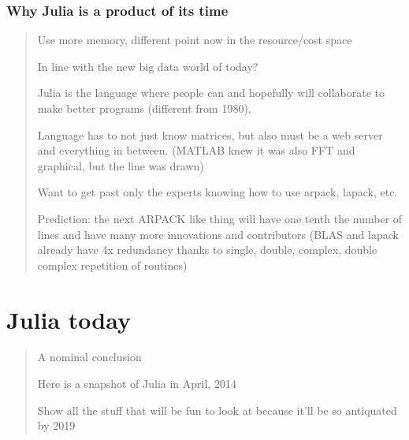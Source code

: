 \documentclass[12pt]{mitthesis}
\begin{document}
\section{Why Julia is a product of its time}
\begin{quotation}
Use more memory, different point now in the resource/cost space

In line with the new big data world of today?

Julia is the language where people can and hopefully will collaborate
to make better programs (different from 1980).

Language has to not just know matrices, but also must be a web server
and everything in between. (MATLAB knew it was also FFT and graphical,
but the line was drawn)

Want to get past only the experts knowing how to use arpack, lapack,
etc.

Prediction: the next ARPACK like thing will have one tenth the number
of lines and have many more innovations and contributors (BLAS and
lapack already have 4x redundancy thanks to single, double, complex,
double complex repetition of routines)
\end{quotation}

\part{Julia today}
\begin{quotation}
A nominal conclusion

Here is a snapshot of Julia in April, 2014

Show all the stuff that will be fun to look at because it\textquoteright{}ll
be so antiquated by 2019\end{quotation}

%
%
%
%
%
%
%
\begin{singlespace}

\end{singlespace}
%
%
\end{document}

